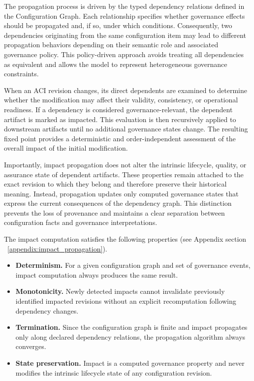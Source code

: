 \documentclass[10pt]{article}
\begin{document}
The propagation process is driven by the typed dependency relations defined in the Configuration Graph. Each relationship specifies whether governance effects should be propagated and, if so, under which conditions. Consequently, two dependencies originating from the same configuration item may lead to different propagation behaviors depending on their semantic role and associated governance policy. This policy-driven approach avoids treating all dependencies as equivalent and allows the model to represent heterogeneous governance constraints.

When an ACI revision changes, its direct dependents are examined to determine whether the modification may affect their validity, consistency, or operational readiness. If a dependency is considered governance-relevant, the dependent artifact is marked as impacted. This evaluation is then recursively applied to downstream artifacts until no additional governance states change. The resulting fixed point provides a deterministic and order-independent assessment of the overall impact of the initial modification.

Importantly, impact propagation does not alter the intrinsic lifecycle, quality, or assurance state of dependent artifacts. These properties remain attached to the exact revision to which they belong and therefore preserve their historical meaning. Instead, propagation updates only computed governance states that express the current consequences of the dependency graph. This distinction prevents the loss of provenance and maintains a clear separation between configuration facts and governance interpretations.

The impact computation satisfies the following properties (see Appendix section ~\ref{appendix:impact_propagation}).

\begin{itemize}
	\item \textbf{Determinism.}
	For a given configuration graph and set of governance events, impact computation always produces the same result.
	
	\item \textbf{Monotonicity.}
	Newly detected impacts cannot invalidate previously identified impacted revisions without an explicit recomputation following dependency changes.
	
	\item \textbf{Termination.}
	Since the configuration graph is finite and impact propagates only along declared dependency relations, the propagation algorithm always converges.
	
	\item \textbf{State preservation.}
	Impact is a computed governance property and never modifies the intrinsic lifecycle state of any configuration revision.
\end{itemize}
\end{document}
